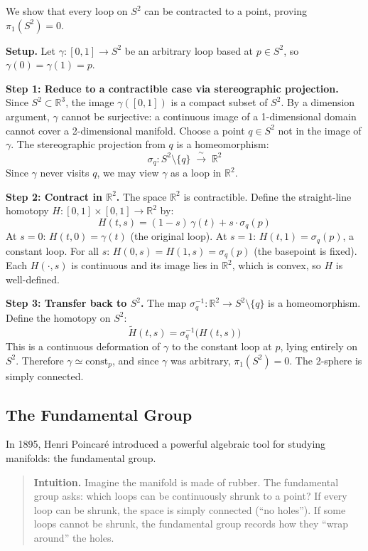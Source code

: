 \begin{example}
\label{ex:s2simplyconnected}
We show that every loop on $S^2$ can be contracted to a point, proving $\pi_1(S^2) = 0$.

\textbf{Setup.} Let $\gamma: [0,1] \to S^2$ be an arbitrary loop based at $p \in S^2$, so $\gamma(0) = \gamma(1) = p$.

\textbf{Step 1: Reduce to a contractible case via stereographic projection.}
Since $S^2 \subset \mathbb{R}^3$, the image $\gamma([0,1])$ is a compact subset of $S^2$. By a dimension argument, $\gamma$ cannot be surjective: a continuous image of a 1-dimensional domain cannot cover a 2-dimensional manifold. Choose a point $q \in S^2$ not in the image of $\gamma$. The stereographic projection from $q$ is a homeomorphism:
\[
\sigma_q: S^2 \setminus \{q\} \;\xrightarrow{\;\sim\;}\; \mathbb{R}^2
\]
Since $\gamma$ never visits $q$, we may view $\gamma$ as a loop in $\mathbb{R}^2$.

\textbf{Step 2: Contract in $\mathbb{R}^2$.}
The space $\mathbb{R}^2$ is contractible. Define the straight-line homotopy $H: [0,1] \times [0,1] \to \mathbb{R}^2$ by:
\[
H(t, s) = (1 - s)\,\gamma(t) + s \cdot \sigma_q(p)
\]
At $s = 0$: $H(t,0) = \gamma(t)$ (the original loop). At $s = 1$: $H(t,1) = \sigma_q(p)$, a constant loop. For all $s$: $H(0,s) = H(1,s) = \sigma_q(p)$ (the basepoint is fixed). Each $H(\cdot, s)$ is continuous and its image lies in $\mathbb{R}^2$, which is convex, so $H$ is well-defined.

\textbf{Step 3: Transfer back to $S^2$.}
The map $\sigma_q^{-1}: \mathbb{R}^2 \to S^2 \setminus \{q\}$ is a homeomorphism. Define the homotopy on $S^2$:
\[
\widetilde{H}(t, s) = \sigma_q^{-1}\bigl(H(t, s)\bigr)
\]
This is a continuous deformation of $\gamma$ to the constant loop at $p$, lying entirely on $S^2$. Therefore $\gamma \simeq \mathrm{const}_p$, and since $\gamma$ was arbitrary, $\pi_1(S^2) = 0$. The 2-sphere is simply connected.
\end{example}

\subsection{The Fundamental Group}

In 1895, Henri Poincar\'{e} introduced a powerful algebraic tool for studying manifolds: the fundamental group.

\begin{quote}
\textbf{Intuition.} Imagine the manifold is made of rubber. The fundamental group asks: which loops can be continuously shrunk to a point? If every loop can be shrunk, the space is simply connected (``no holes''). If some loops cannot be shrunk, the fundamental group records how they ``wrap around'' the holes.
\end{quote}

